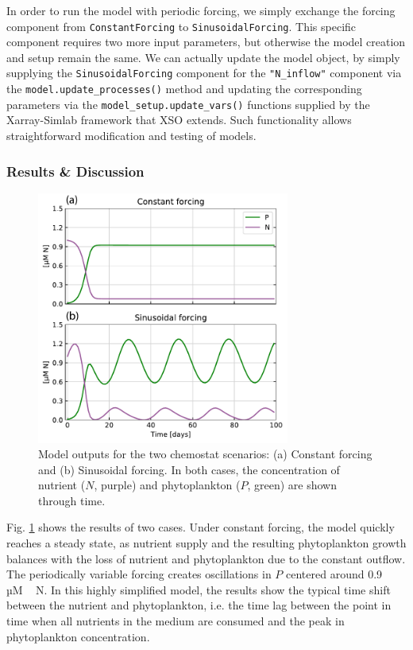 \documentclass[journal abbreviation, manuscript]{copernicus}
\begin{document}
In order to run the model with periodic forcing, we simply exchange the forcing component from \texttt{ConstantForcing} to \texttt{SinusoidalForcing}. This specific component requires two more input parameters, but otherwise the model creation and setup remain the same. We can actually update the model object, by simply supplying the \texttt{SinusoidalForcing} component for the \texttt{"N\_inflow"} component via the \texttt{model.update\_processes()} method and updating the corresponding parameters via the \texttt{model\_setup.update\_vars()} functions supplied by the Xarray-Simlab framework that XSO extends. Such functionality allows straightforward modification and testing of models.

\subsubsection{Results \& Discussion}

\begin{figure}[t]
\includegraphics[width=8.3cm]{Figures/firstdraft_plots/01_chemostat_output.pdf}
\caption{Model outputs for the two chemostat scenarios: (a) Constant forcing and (b) Sinusoidal forcing. In both cases, the concentration of nutrient ($N$, purple) and phytoplankton ($P$, green) are shown through time.}
\label{Figure:ResultsChemostat}
\end{figure}

Fig. \ref{Figure:ResultsChemostat} shows the results of two cases. Under constant forcing, the model quickly reaches a steady state, as nutrient supply and the resulting phytoplankton growth balances with the loss of nutrient and phytoplankton due to the constant outflow. The periodically variable forcing creates oscillations in $P$ centered around 0.9 \unit{µM\,N}. In this highly simplified model, the results show the typical time shift between the nutrient and phytoplankton, i.e. the time lag between the point in time when all nutrients in the medium are consumed and the peak in phytoplankton concentration.
\end{document}
